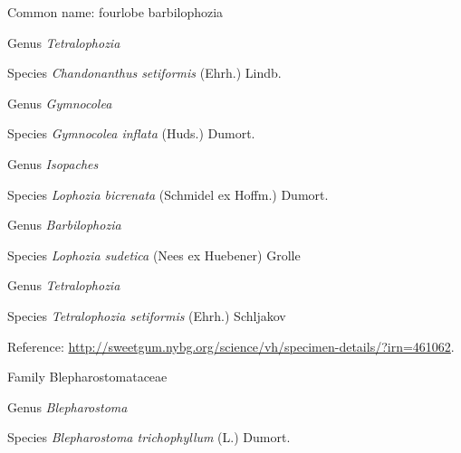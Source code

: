 \documentclass[9pt, article]{memoir}
\begin{document}
\begin{multicols}{2}
Common name: fourlobe barbilophozia

\vspace{6pt}\noindent\hspace{30pt}Genus \textit{Tetralophozia}


\vspace{6pt}\noindent\hspace{36pt}Species \textit{Chandonanthus setiformis} (Ehrh.) Lindb.


\vspace{6pt}\noindent\hspace{30pt}Genus \textit{Gymnocolea}


\vspace{6pt}\noindent\hspace{36pt}Species \textit{Gymnocolea inflata} (Huds.) Dumort.


\vspace{6pt}\noindent\hspace{30pt}Genus \textit{Isopaches}


\vspace{6pt}\noindent\hspace{36pt}Species \textit{Lophozia bicrenata} (Schmidel ex Hoffm.) Dumort.


\vspace{6pt}\noindent\hspace{30pt}Genus \textit{Barbilophozia}


\vspace{6pt}\noindent\hspace{36pt}Species \textit{Lophozia sudetica} (Nees ex Huebener) Grolle


\vspace{6pt}\noindent\hspace{30pt}Genus \textit{Tetralophozia}


\vspace{6pt}\noindent\hspace{36pt}Species \textit{Tetralophozia setiformis} (Ehrh.) Schljakov


Reference: 
\url{http://sweetgum.nybg.org/science/vh/specimen-details/?irn=461062}.

\vspace{6pt}\noindent\hspace{24pt}Family Blepharostomataceae


\vspace{6pt}\noindent\hspace{30pt}Genus \textit{Blepharostoma}


\vspace{6pt}\noindent\hspace{36pt}Species \textit{Blepharostoma trichophyllum} (L.) Dumort.



\end{multicols}
\end{document}
